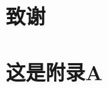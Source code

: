 \documentclass[master]{cugthesis}
\begin{document}
    
    

    \backmatter
    \chapter{致谢}

    \appendix
    \chapter{这是附录A}
\end{document}
